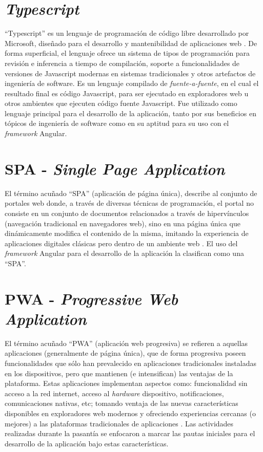 \section{\textit{Typescript}}

``Typescript'' es un lenguaje de programación de código libre desarrollado por Microsoft, diseñado para el desarrollo y mantenibilidad de aplicaciones web \cite{typescript}. De forma superficial, el lenguaje ofrece un sistema de tipos de programación para revisión e inferencia a tiempo de compilación, soporte a funcionalidades de versiones de Javascript modernas en sistemas tradicionales y otros artefactos de ingeniería de software. Es un lenguaje compilado de \textit{fuente-a-fuente}, en el cual el resultado final es código Javascript, para ser ejecutado en exploradores web u otros ambientes que ejecuten código fuente Javascript. Fue utilizado como lenguaje principal para el desarrollo de la aplicación, tanto por sus beneficios en tópicos de ingeniería de software como en su aptitud para su uso con el \textit{framework} Angular.

\section{SPA - \textit{Single Page Application}}

El término acuñado ``SPA'' (aplicación de página única), describe al conjunto de portales web donde, a través de diversas técnicas de programación, el portal no consiste en un conjunto de documentos relacionados a través de hipervínculos (navegación tradicional en navegadores web), sino en una página única que dinámicamente modifica el contenido de la misma, imitando la experiencia de aplicaciones digitales clásicas pero dentro de un ambiente web \cite{spa}. El uso del \textit{framework} Angular para el desarrollo de la aplicación la clasifican como una ``SPA''.

\section{PWA - \textit{Progressive Web Application}}

El término acuñado ``PWA'' (aplicación web progresiva) se refieren a aquellas aplicaciones (generalmente de página única), que de forma progresiva poseen funcionalidades que sólo han prevalecido en aplicaciones tradicionales instaladas en los dispositivos, pero que mantienen (e intensifican) las ventajas de la plataforma. Estas aplicaciones implementan aspectos como: funcionalidad sin acceso a la red internet, acceso al \textit{hardware} dispositivo, notificaciones, comunicaciones nativas, etc; tomando ventaja de las nuevas características disponibles en exploradores web modernos y ofreciendo experiencias cercanas (o mejores) a las plataformas tradicionales de aplicaciones \cite{pwa}. Las actividades realizadas durante la pasantía se enfocaron a marcar las pautas iniciales para el desarrollo de la aplicación bajo estas características.

